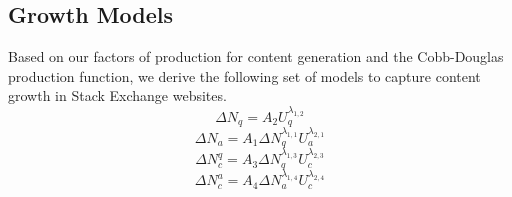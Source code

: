 \subsection{Growth Models}
Based on our factors of production for content generation and the Cobb-Douglas production function, we derive the following set of models to capture content growth in Stack Exchange websites. 
\begin{equation}
\Delta N_q = A_2 U_q^{\lambda_{1, 2}}
\end{equation}
\begin{equation}
\Delta N_a = A_1 \Delta N_q^{\lambda_{1, 1}} U_a^{\lambda_{2, 1}}
\end{equation}
\begin{equation}
\Delta N_c^q = A_3 \Delta N_q^{\lambda_{1, 3}} U_c^{\lambda_{2, 3}}
\end{equation}
\begin{equation}
\Delta N_c^a = A_4 \Delta N_a^{\lambda_{1, 4}} U_c^{\lambda_{2, 4}}
\end{equation}


